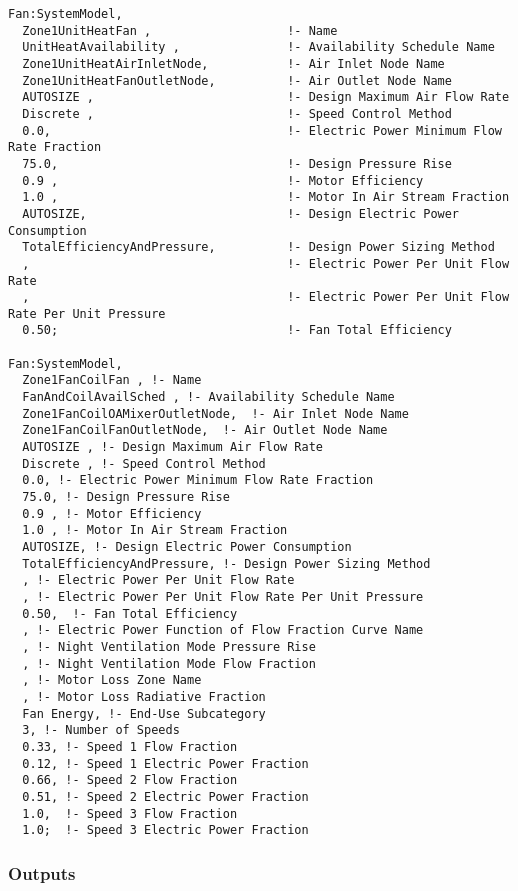 \begin{lstlisting}
Fan:SystemModel,
  Zone1UnitHeatFan ,                   !- Name
  UnitHeatAvailability ,               !- Availability Schedule Name
  Zone1UnitHeatAirInletNode,           !- Air Inlet Node Name
  Zone1UnitHeatFanOutletNode,          !- Air Outlet Node Name
  AUTOSIZE ,                           !- Design Maximum Air Flow Rate
  Discrete ,                           !- Speed Control Method
  0.0,                                 !- Electric Power Minimum Flow Rate Fraction
  75.0,                                !- Design Pressure Rise
  0.9 ,                                !- Motor Efficiency
  1.0 ,                                !- Motor In Air Stream Fraction
  AUTOSIZE,                            !- Design Electric Power Consumption
  TotalEfficiencyAndPressure,          !- Design Power Sizing Method
  ,                                    !- Electric Power Per Unit Flow Rate
  ,                                    !- Electric Power Per Unit Flow Rate Per Unit Pressure
  0.50;                                !- Fan Total Efficiency

Fan:SystemModel,
  Zone1FanCoilFan , !- Name
  FanAndCoilAvailSched , !- Availability Schedule Name
  Zone1FanCoilOAMixerOutletNode,  !- Air Inlet Node Name
  Zone1FanCoilFanOutletNode,  !- Air Outlet Node Name
  AUTOSIZE , !- Design Maximum Air Flow Rate
  Discrete , !- Speed Control Method
  0.0, !- Electric Power Minimum Flow Rate Fraction
  75.0, !- Design Pressure Rise
  0.9 , !- Motor Efficiency
  1.0 , !- Motor In Air Stream Fraction
  AUTOSIZE, !- Design Electric Power Consumption
  TotalEfficiencyAndPressure, !- Design Power Sizing Method
  , !- Electric Power Per Unit Flow Rate
  , !- Electric Power Per Unit Flow Rate Per Unit Pressure
  0.50,  !- Fan Total Efficiency
  , !- Electric Power Function of Flow Fraction Curve Name
  , !- Night Ventilation Mode Pressure Rise
  , !- Night Ventilation Mode Flow Fraction
  , !- Motor Loss Zone Name
  , !- Motor Loss Radiative Fraction
  Fan Energy, !- End-Use Subcategory
  3, !- Number of Speeds
  0.33, !- Speed 1 Flow Fraction
  0.12, !- Speed 1 Electric Power Fraction
  0.66, !- Speed 2 Flow Fraction
  0.51, !- Speed 2 Electric Power Fraction
  1.0,  !- Speed 3 Flow Fraction
  1.0;  !- Speed 3 Electric Power Fraction

\end{lstlisting}

\subsubsection{Outputs}\label{outputs-fansysmodel}

